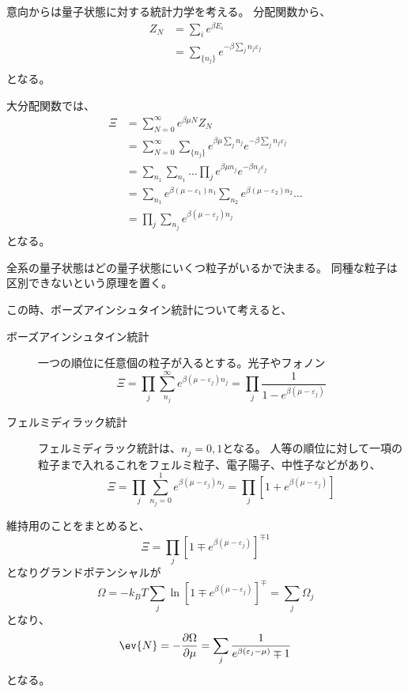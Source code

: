 \documentclass[titlepage]{ltjsarticle}
\begin{document}
意向からは量子状態に対する統計力学を考える。
分配関数から、
\begin{align}
  Z_N & = \sum_i e^{\beta E_i} \\
  & = \sum_{\{n_j\}} e^{-\beta \sum_j n_j \varepsilon_j} \\
\end{align}
となる。

大分配関数では、
\begin{align}
  \Xi & = \sum_{N=0}^{\infty}e^{\beta \mu N} Z_N \\
  & = \sum_{N=0}^{\infty}\sum_{\{n_j\}}^{}e^{\beta \mu \sum_j n_j} e^{-\beta \sum_j n_j \varepsilon_j} \\
  & = \sum_{n_1}\sum_{n_1}\dots \prod_j e^{\beta \mu n_j} e^{-\beta n_j \varepsilon_j} \\
  & = \sum_{n_1} e^{\beta(\mu - \varepsilon_1)n_1}\sum_{n_2} e^{\beta(\mu - \varepsilon_2)n_2}\dots \\
  & = \prod_j \sum_{n_j} e^{\beta(\mu - \varepsilon_j)n_j} 
\end{align}
となる。

全系の量子状態はどの量子状態にいくつ粒子がいるかで決まる。
同種な粒子は区別できないという原理を置く。

この時、ボーズアインシュタイン統計について考えると、
\begin{description}
  \item[ボーズアインシュタイン統計] 一つの順位に任意個の粒子が入るとする。光子やフォノン
  \begin{equation}
    \Xi = \prod_j \sum_{n_j}^{\infty}e^{\beta(\mu-\varepsilon_j)n_j} = \prod_j \frac{1}{1-e^{\beta(\mu-\varepsilon_j)}}
  \end{equation}
  \item[フェルミディラック統計] フェルミディラック統計は、\(n_j=0,1\)となる。
  人等の順位に対して一項の粒子まで入れるこれをフェルミ粒子、電子陽子、中性子などがあり、
  \begin{equation}
    \Xi = \prod_j \sum^1_{n_j=0} e^{\beta(\mu - \varepsilon_j)n_j} = \prod_j \left[ 1 + e^{\beta(\mu-\varepsilon_j)} \right]
  \end{equation}
\end{description}
維持用のことをまとめると、
\begin{equation}
  \Xi = \prod_j \left[ 1 \mp e^{\beta(\mu-\varepsilon_j)} \right]^{\mp 1}
\end{equation}
となりグランドポテンシャルが
\begin{equation}
  \Omega = -k_BT \sum_j \ln \left[ 1 \mp e^{\beta(\mu-\varepsilon_j)} \right]^{\mp} = \sum_j \Omega_j 
\end{equation}
となり、
\begin{equation}
  \ev{N} = - \pdv{\Omega}{\mu} = \sum_j \frac{1}{e^{\beta(\varepsilon_j-\mu)} \mp 1}
\end{equation}
となる。
\end{document}
